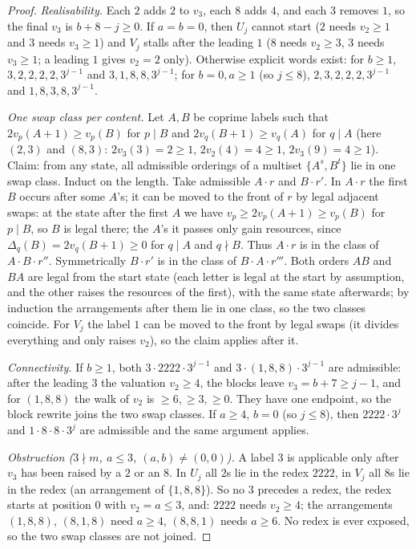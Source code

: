 \begin{proof}
\emph{Realisability.} Each $2$ adds $2$ to $v_3$, each $8$ adds $4$, and each $3$ removes $1$, so the final $v_3$ is $b+8-j\ge0$. If $a=b=0$, then $U_j$ cannot start ($2$ needs $v_2\ge1$ and $3$ needs $v_3\ge1$) and $V_j$ stalls after the leading $1$ ($8$ needs $v_2\ge3$, $3$ needs $v_3\ge1$; a leading $1$ gives $v_2=2$ only). Otherwise explicit words exist: for $b\ge1$, $3,2,2,2,2,3^{j-1}$ and $3,1,8,8,3^{j-1}$; for $b=0,a\ge1$ (so $j\le8$), $2,3,2,2,2,3^{j-1}$ and $1,8,3,8,3^{j-1}$.

\emph{One swap class per content.} Let $A,B$ be coprime labels such that $2v_p(A+1)\ge v_p(B)$ for $p\mid B$ and $2v_q(B+1)\ge v_q(A)$ for $q\mid A$ (here $(2,3)$ and $(8,3)$: $2v_3(3)=2\ge1$, $2v_2(4)=4\ge1$, $2v_3(9)=4\ge1$). Claim: from any state, all admissible orderings of a multiset $\{A^s,B^t\}$ lie in one swap class. Induct on the length. Take admissible $A\cdot r$ and $B\cdot r'$. In $A\cdot r$ the first $B$ occurs after some $A$'s; it can be moved to the front of $r$ by legal adjacent swaps: at the state after the first $A$ we have $v_p\ge 2v_p(A+1)\ge v_p(B)$ for $p\mid B$, so $B$ is legal there; the $A$'s it passes only gain resources, since $\Delta_q(B)=2v_q(B+1)\ge0$ for $q\mid A$ and $q\nmid B$. Thus $A\cdot r$ is in the class of $A\cdot B\cdot r''$. Symmetrically $B\cdot r'$ is in the class of $B\cdot A\cdot r'''$. Both orders $AB$ and $BA$ are legal from the start state (each letter is legal at the start by assumption, and the other raises the resources of the first), with the same state afterwards; by induction the arrangements after them lie in one class, so the two classes coincide. For $V_j$ the label $1$ can be moved to the front by legal swaps (it divides everything and only raises $v_2$), so the claim applies after it.

\emph{Connectivity.} If $b\ge1$, both $3\cdot2222\cdot3^{j-1}$ and $3\cdot(1,8,8)\cdot3^{j-1}$ are admissible: after the leading $3$ the valuation $v_2\ge4$, the blocks leave $v_3=b+7\ge j-1$, and for $(1,8,8)$ the walk of $v_2$ is $\ge6,\ge3,\ge0$. They have one endpoint, so the block rewrite joins the two swap classes. If $a\ge4$, $b=0$ (so $j\le8$), then $2222\cdot3^j$ and $1\cdot8\cdot8\cdot3^j$ are admissible and the same argument applies.

\emph{Obstruction ($3\nmid m$, $a\le3$, $(a,b)\ne(0,0)$).} A label $3$ is applicable only after $v_3$ has been raised by a $2$ or an $8$. In $U_j$ all $2$s lie in the redex $2222$, in $V_j$ all $8$s lie in the redex (an arrangement of $\{1,8,8\}$). So no $3$ precedes a redex, the redex starts at position $0$ with $v_2=a\le3$, and: $2222$ needs $v_2\ge4$; the arrangements $(1,8,8)$, $(8,1,8)$ need $a\ge4$, $(8,8,1)$ needs $a\ge6$. No redex is ever exposed, so the two swap classes are not joined.
\end{proof}
